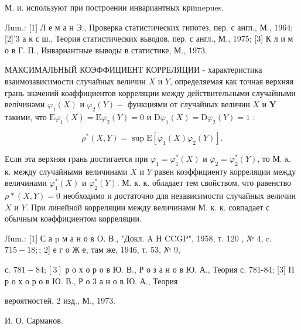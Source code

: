 \documentclass[10pt]{article}
\begin{document}
М. и. используют при построении инвариантных криmepues.



Лum.: [1] Л е м а н Э., Проверка статистических гипотез, пер. с англ., М., 1964; [2]'3 а к с ш., Теория статистических вьводов, пер. с англ., М., 1975; [3] К л и м о в Г. П., Инвариантные выводы в статистике, М., 1973.



МАКСИМАЛЬНЫЙ КОЭФФИЦИЕНТ КОРРЕЛЯЦИИ - характеристика взаимозависимости случайных величин $X$ и $Y$, определяемая как точная верхняя грань значений коәффициентов корреляции между действительными случайными велічинами $\varphi_{1}(X)$ и $\varphi_{2}(Y)-$ функциями от случайных величин $X$ и $\boldsymbol{Y}$ такими, что $\mathrm{E} \varphi_{1}(X)=\mathrm{E} \varphi_{2}(Y)=0$ и $\mathrm{D} \varphi_{1}(X)=\mathrm{D} \varphi_{2}(Y)=1$ :



\[

\rho^{*}(X, Y)=\sup \mathrm{E}\left[\varphi_{1}(X) \varphi_{2}(Y)\right] .

\]



Если эта верхняя грань достигается при $\varphi_{1}=\varphi_{1}^{*}(X)$ и $\varphi_{2}=\varphi_{2}^{*}(Y)$, то М. к. к. между случайными величинами $X$ и $Y$ равен коэффициенту корреляции между величинами $\varphi_{1}^{*}(X)$ и $\varphi_{2}^{*}(Y)$. М. к. к. обладает тем свойством, что равенство $\rho *(X, Y)=0$ необходимо и достаточно для независимости случайных величин $X$ и $Y$. При линейной корреляции между величинами М. к. к. совпадает с обычным коәффициентом корреляции.



Лum.: [1] С а p м а н о в O. В., "Докл. A Н CCGP", 1958, т. 120 , № 4, c. $715-18 ;$; 2] е г о Ж е, там же, 1946, т. 53, № 9,

с. $781-84 ;[3]$ р о х о р о в Ю. В., Р о з а н о в Ю. А., Теория с. 781-84; [3] П р о х о р о в Ю. В., Р о 3 а н о в Ю. А., Теория

вероятностей, 2 изд., М., 1973.

И. О. Сарманов.
\end{document}
